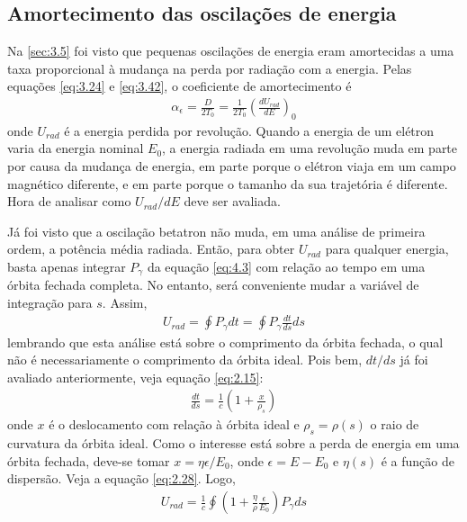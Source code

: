 \subsection{Amortecimento das oscilações de energia}\label{sec:4.2}
Na \autoref{sec:3.5} foi visto que pequenas oscilações de energia eram amortecidas a uma taxa proporcional à mudança na perda por radiação com a energia. Pelas equações \eqref{eq:3.24} e \eqref{eq:3.42}, o coeficiente de amortecimento é
\begin{align}
	\alpha_\epsilon = \frac{D}{2T_0} = \frac{1}{2T_0}\left(\frac{dU_{rad}}{dE}\right)_0
\end{align}
onde $U_{rad}$ é a energia perdida por revolução. Quando a energia de um elétron varia da energia nominal $E_0$, a energia radiada em uma revolução muda em parte por causa da mudança de energia, em parte porque o elétron viaja em um campo magnético diferente, e em parte porque o tamanho da sua trajetória é diferente. Hora de analisar como $U_{rad}/dE$ deve ser avaliada.

Já foi visto que a oscilação betatron não muda, em uma análise de primeira ordem, a potência média radiada. Então, para obter $U_{rad}$ para qualquer energia, basta apenas integrar $P_\gamma$ da equação \eqref{eq:4.3} com relação ao tempo em uma órbita fechada completa. No entanto, será conveniente mudar a variável de integração para $s$. Assim,
\begin{align}
	U_{rad} = \oint P_\gamma dt = \oint P_\gamma \frac{dt}{ds}ds
\end{align}
lembrando que esta análise está sobre o comprimento da órbita fechada, o qual não é necessariamente o comprimento da órbita ideal. Pois bem, $dt/ds$ já foi avaliado anteriormente, veja equação  \eqref{eq:2.15}:
\begin{align*}
	\frac{dt}{ds} = \frac{1}{c} \left(1+\frac{x}{\rho_s}\right)
\end{align*}
onde $x$ é o deslocamento com relação à órbita ideal e $\rho_s = \rho(s)$ o raio de curvatura da órbita ideal. Como o interesse está sobre a perda de energia em uma órbita fechada, deve-se tomar $x = \eta \epsilon/E_0$, onde $\epsilon = E-E_0$ e $\eta(s)$ é a função de dispersão. Veja a equação \eqref{eq:2.28}. Logo,
\begin{align}
	U_{rad} = \frac{1}{c} \oint \left(1+ \frac{\eta}{\rho}\frac{\epsilon}{E_0}\right)P_\gamma ds
\end{align}

